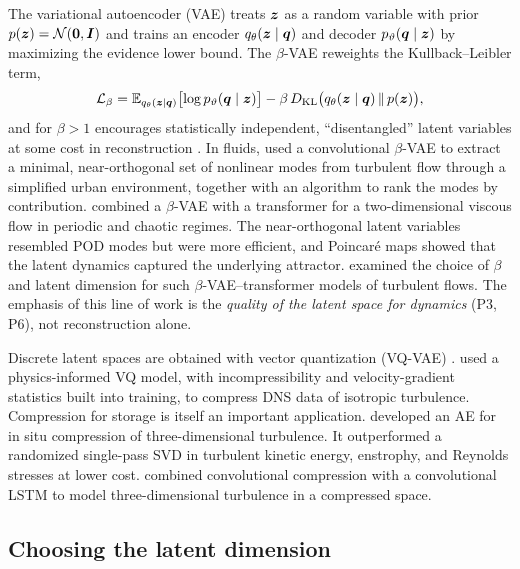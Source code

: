 The variational autoencoder (VAE) \parencite{kingma2014vae} treats $\bm{z}$ as a
random variable with prior $p(\bm{z})=\mathcal{N}(\bm{0},\bm{I})$ and trains an
encoder $q_{\theta}(\bm{z}\mid\bm{q})$ and decoder $p_{\vartheta}(\bm{q}\mid\bm{z})$ by
maximizing the evidence lower bound. The $\beta$-VAE \parencite{higgins2017betavae}
reweights the Kullback--Leibler term,
\begin{equation}
  \mathcal{L}_{\beta}=\mathbb{E}_{q_{\theta}(\bm{z}\mid\bm{q})}\bigl[\log p_{\vartheta}(\bm{q}\mid\bm{z})\bigr]
  -\beta\,D_{\mathrm{KL}}\bigl(q_{\theta}(\bm{z}\mid\bm{q})\,\|\,p(\bm{z})\bigr),
\end{equation}
and for $\beta>1$ encourages statistically independent, ``disentangled''
latent variables at some cost in reconstruction
\parencite{burgess2018understanding}. In fluids, \textcite{eivazi2022betavae}
used a convolutional $\beta$-VAE to extract a minimal, near-orthogonal set of
nonlinear modes from turbulent flow through a simplified urban environment,
together with an algorithm to rank the modes by contribution.
\textcite{solera2024betavae} combined a $\beta$-VAE with a transformer for a
two-dimensional viscous flow in periodic and chaotic regimes. The
near-orthogonal latent variables resembled POD modes but were more efficient,
and Poincar\'e maps showed that the latent dynamics captured the underlying
attractor. \textcite{wang2024optimal} examined the choice of $\beta$ and latent
dimension for such $\beta$-VAE--transformer models of turbulent flows. The
emphasis of this line of work is the \emph{quality of the latent space for
dynamics} (P3, P6), not reconstruction alone.

Discrete latent spaces are obtained with vector quantization (VQ-VAE)
\parencite{vandenoord2017vqvae}. \textcite{momenifar2022vq} used a
physics-informed VQ model, with incompressibility and velocity-gradient
statistics built into training, to compress DNS data of isotropic turbulence.
Compression for storage is itself an important application.
\textcite{glaws2020insitu} developed an AE for in situ compression of
three-dimensional turbulence. It outperformed a randomized single-pass SVD in
turbulent kinetic energy, enstrophy, and Reynolds stresses at lower cost.
\textcite{mohan2019ccl} combined convolutional compression with a convolutional
LSTM to model three-dimensional turbulence in a compressed space.

\subsection{Choosing the latent dimension}

